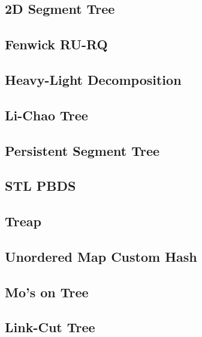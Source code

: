 \subsection{2D Segment Tree}

\subsection{Fenwick RU-RQ}

\subsection{Heavy-Light Decomposition}

\subsection{Li-Chao Tree}

\subsection{Persistent Segment Tree}

\subsection{STL PBDS}

\subsection{Treap}

\subsection{Unordered Map Custom Hash}

\subsection{Mo's on Tree}

\subsection{Link-Cut Tree}

